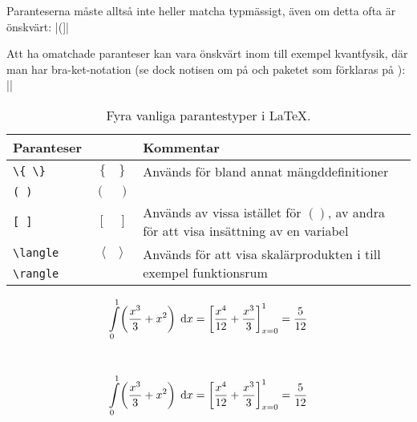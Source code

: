 \documentclass[lang=sv,ptsize=10pt,font=none,nomath,titles=bf,../../a4.tex]{subfiles}
\begin{document}
Paranteserna måste alltså inte heller matcha typmässigt, även om detta
ofta är önskvärt:
\latex|\left(\right]|

Att ha omatchade paranteser kan vara önskvärt inom till exempel
kvantfysik, där man har bra-ket-notation (se dock notisen om 
på  och paketet  som förklaras 
på ):
\latex|\left\langle\psi\right\vert|

\begin{table}[t]
	\centering 
	\caption{Fyra vanliga parantestyper i \LaTeX.}
	\label{tab:paranteser}
	\begin{tabular}{lcp{}}
		\toprule 
		Paranteser & & Kommentar \\
		\midrule 
		\verb|\{ \}| & \(\{\quad\}\) & Används för bland annat 
		mängddefinitioner \\
		\texttt{( )} & \( (\quad) \) & \\
		\texttt{[ ]} & \( [\quad] \) & Används av vissa istället för 
		\(()\), av andra för att visa insättning av en variabel\\
		\verb|\langle| & \(\langle\quad\rangle\) &
		\multirow{2}{0.5\textwidth}{Används för att visa skalärprodukten i
		till exempel funktionsrum}\\
		\verb|\rangle| & & \\
		\bottomrule 
	\end{tabular}
\end{table}

\begin{kod}[tbp]
	\centering 
	\begin{minipage}{0.85\textwidth}
		\begin{latexcode}
\begin{equation*}
\int\limits_0^1\!\left(\dfrac{x^3}{3} +
x^2\right)\d{x} = \left[\dfrac{x^4}{12} +
\dfrac{x^3}{3}\right]_{x=0}^1 = \dfrac{5}{12}
\end{equation*}
		\end{latexcode}
	\end{minipage}
	\\
	\begin{equation*}
		\displaystyle\int\limits_0^1\!\left(\dfrac{x^3}{3} +
		x^2\right)\d{x} = \left[\dfrac{x^4}{12} + 
		\dfrac{x^3}{3}\right]_{x=0}^1 = \dfrac{5}{12}
	\end{equation*}
	\caption{Skalbara paranteser med  och .}
	\label{ex:paranteser}
\end{kod}
\end{document}
